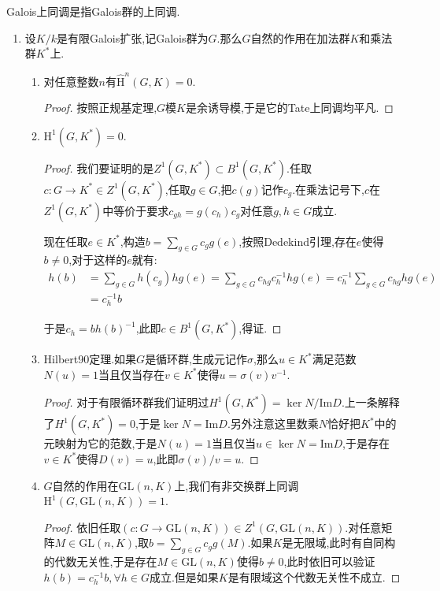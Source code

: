 Galois上同调是指Galois群的上同调.
\begin{enumerate}
	\item 设$K/k$是有限Galois扩张,记Galois群为$G$.那么$G$自然的作用在加法群$K$和乘法群$K^*$上.
	\begin{enumerate}[(1)]
		\item 对任意整数$n$有$\widehat{\mathrm{H}}^n(G,K)=0$.
		\begin{proof}
			
			按照正规基定理,$G$模$K$是余诱导模,于是它的Tate上同调均平凡.
		\end{proof}
		\item $\mathrm{H}^1(G,K^*)=0$.
		\begin{proof}
			
			我们要证明的是$Z^1(G,K^*)\subset B^1(G,K^*)$.任取$c:G\to K^*\in Z^1(G,K^*)$,任取$g\in G$,把$c(g)$记作$c_g$.在乘法记号下,$c$在$Z^1(G,K^*)$中等价于要求$c_{gh}=g(c_h)c_g$对任意$g,h\in G$成立.
			
			现在任取$e\in K^*$,构造$b=\sum_{g\in G}c_gg(e)$,按照Dedekind引理,存在$e$使得$b\not=0$,对于这样的$e$就有:
			\begin{align*}
				h(b)&=\sum_{g\in G}h(c_g)hg(e)=\sum_{g\in G}c_{hg}c_h^{-1}hg(e)=c_h^{-1}\sum_{g\in G}c_{hg}hg(e)\\&=c_h^{-1}b
			\end{align*}
			
			于是$c_h=bh(b)^{-1}$,此即$c\in B^1(G,K^*)$,得证.
		\end{proof}
	    \item Hilbert90定理.如果$G$是循环群,生成元记作$\sigma$,那么$u\in K^*$满足范数$N(u)=1$当且仅当存在$v\in K^*$使得$u=\sigma(v)v^{-1}$.
	    \begin{proof}
	    	
	    	对于有限循环群我们证明过$H^1(G,K^*)=\ker N/\mathrm{Im}D$.上一条解释了$H^1(G,K^*)=0$,于是$\ker N=\mathrm{Im}D$.另外注意这里数乘$N$恰好把$K^*$中的元映射为它的范数,于是$N(u)=1$当且仅当$u\in\ker N=\mathrm{Im}D$,于是存在$v\in K^*$使得$D(v)=u$,此即$\sigma(v)/v=u$.
	    \end{proof}
        \item $G$自然的作用在$\mathrm{GL}(n,K)$上,我们有非交换群上同调$\mathrm{H}^1(G,\mathrm{GL}(n,K))=1$.
        \begin{proof}
        	
        	依旧任取$\left(c:G\to\mathrm{GL}(n,K)\right)\in Z^1(G,\mathrm{GL}(n,K))$.对任意矩阵$M\in\mathrm{GL}(n,K)$,取$b=\sum_{g\in G}c_gg(M)$.如果$K$是无限域,此时有自同构的代数无关性,于是存在$M\in\mathrm{GL}(n,K)$使得$b\not=0$,此时依旧可以验证$h(b)=c_h^{-1}b,\forall h\in G$成立.但是如果$K$是有限域这个代数无关性不成立.
        	

\end{proof}
\end{enumerate}
\end{enumerate}
